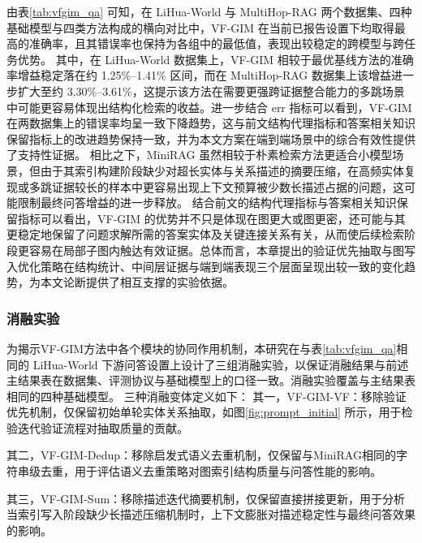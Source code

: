 \documentclass[promaster, vlined]{DissertUESTC}
\begin{document}
由表\ref{tab:vfgim_qa} 可知，在 LiHua-World 与 MultiHop-RAG 两个数据集、四种基础模型与四类方法构成的横向对比中，VF-GIM 在当前已报告设置下均取得最高的准确率，且其错误率也保持为各组中的最低值，表现出较稳定的跨模型与跨任务优势。
其中，在 LiHua-World 数据集上，VF-GIM 相较于最优基线方法的准确率增益稳定落在约 1.25\%--1.41\% 区间，而在 MultiHop-RAG 数据集上该增益进一步扩大至约 3.30\%--3.61\%，这提示该方法在需要更强跨证据整合能力的多跳场景中可能更容易体现出结构化检索的收益。进一步结合 err 指标可以看到，VF-GIM 在两数据集上的错误率均呈一致下降趋势，这与前文结构代理指标和答案相关知识保留指标上的改进趋势保持一致，并为本文方案在端到端场景中的综合有效性提供了支持性证据。
相比之下，MiniRAG 虽然相较于朴素检索方法更适合小模型场景，但由于其索引构建阶段缺少对超长实体与关系描述的摘要压缩，在高频实体复现或多跳证据较长的样本中更容易出现上下文预算被少数长描述占据的问题，这可能限制最终问答增益的进一步释放。
结合前文的结构代理指标与答案相关知识保留指标可以看出，VF-GIM 的优势并不只是体现在图更大或图更密，还可能与其更稳定地保留了问题求解所需的答案实体及关键连接关系有关，从而使后续检索阶段更容易在局部子图内触达有效证据。总体而言，本章提出的验证优先抽取与图写入优化策略在结构统计、中间层证据与端到端表现三个层面呈现出较一致的变化趋势，为本文论断提供了相互支撑的实验依据。

\subsubsection{消融实验}

为揭示VF-GIM方法中各个模块的协同作用机制，本研究在与表\ref{tab:vfgim_qa}相同的 LiHua-World 下游问答设置上设计了三组消融实验，以保证消融结果与前述主结果表在数据集、评测协议与基础模型上的口径一致。消融实验覆盖与主结果表相同的四种基础模型。
三种消融变体定义如下：
其一，VF-GIM-VF：移除验证优先机制，仅保留初始单轮实体关系抽取，如图\ref{fig:prompt_initial} 所示，用于检验迭代验证流程对抽取质量的贡献。

其二，VF-GIM-Dedup：移除启发式语义去重机制，仅保留与MiniRAG\cite{fan2024minirag}相同的字符串级去重，用于评估语义去重策略对图索引结构质量与问答性能的影响。

其三，VF-GIM-Sum：移除描述迭代摘要机制，仅保留直接拼接更新，用于分析当索引写入阶段缺少长描述压缩机制时，上下文膨胀对描述稳定性与最终问答效果的影响。
\end{document}
